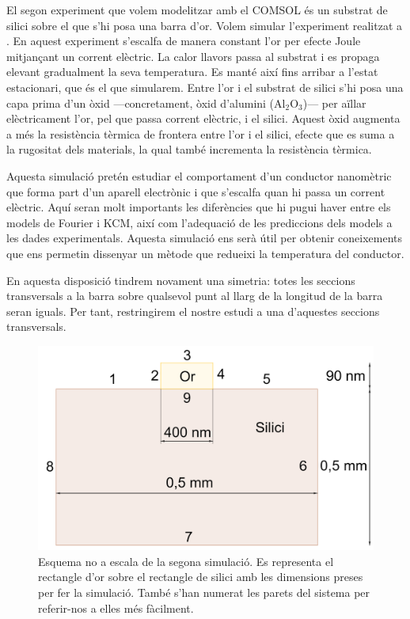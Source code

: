 \documentclass{article}
\begin{document}
El segon experiment que volem modelitzar amb el COMSOL \'{e}s un substrat de silici sobre el que s'hi posa una barra d'or. Volem simular l'experiment realitzat a \cite{ziabari2017non}. En aquest experiment s'escalfa de manera constant l'or per efecte Joule mitjan\c{c}ant un corrent el\`{e}ctric. La calor llavors passa al substrat i es propaga elevant gradualment la seva temperatura. Es mant\'{e} aix\'{i} fins arribar a l'estat estacionari, que \'{e}s el que simularem. Entre l'or i el substrat de silici s'hi posa una capa prima d'un \`{o}xid ---concretament, \`{o}xid d'alumini (Al$_2$O$_3$)--- per a\"{i}llar el\`{e}ctricament l'or, pel que passa corrent el\`{e}ctric, i el silici. Aquest \`{o}xid augmenta a m\'{e}s la resist\`{e}ncia t\`{e}rmica de frontera entre l'or i el silici, efecte que es suma a la rugositat dels materials, la qual tamb\'{e} incrementa la resist\`{e}ncia t\`{e}rmica.

Aquesta simulaci\'{o} pret\'{e}n estudiar el comportament d'un conductor nanom\`{e}tric que forma part d'un aparell electr\`{o}nic i que s'escalfa quan hi passa un corrent el\`{e}ctric. Aqu\'{i} seran molt importants les difer\`{e}ncies que hi pugui haver entre els models de Fourier i KCM, aix\'{i} com l'adequaci\'{o} de les prediccions dels models a les dades experimentals. Aquesta simulaci\'{o} ens ser\`{a} \'{u}til per obtenir coneixements que ens permetin dissenyar un m\`{e}tode que redueixi la temperatura del conductor.

En aquesta disposici\'{o} tindrem novament una simetria: totes les seccions transversals a la barra sobre qualsevol punt al llarg de la longitud de la barra seran iguals. Per tant, restringirem el nostre estudi a una d'aquestes seccions transversals.

\begin{figure}[ht!]
\begin{center}
\includegraphics[scale=1]{../grafics/esquema/esquema.png}
\caption{Esquema no a escala de la segona simulaci\'{o}. Es representa el rectangle d'or sobre el rectangle de silici amb les dimensions preses per fer la simulaci\'{o}. Tamb\'{e} s'han numerat les parets del sistema per referir-nos a elles m\'{e}s f\`{a}cilment.}
\label{Fig:esquema2}
\end{center}
\end{figure}
\end{document}
